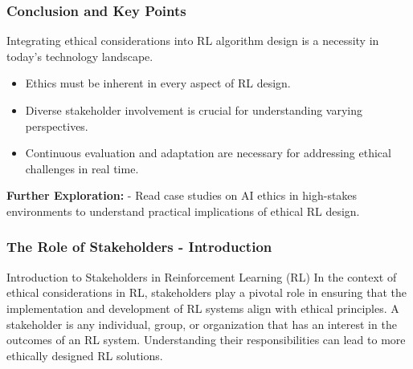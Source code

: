 \documentclass[aspectratio=169]{beamer}
\begin{document}
\begin{frame}[fragile]
    \frametitle{Conclusion and Key Points}
    
    Integrating ethical considerations into RL algorithm design is a necessity in today's technology landscape. 

    \begin{itemize}
        \item Ethics must be inherent in every aspect of RL design.
        \item Diverse stakeholder involvement is crucial for understanding varying perspectives.
        \item Continuous evaluation and adaptation are necessary for addressing ethical challenges in real time.
    \end{itemize}

    \textbf{Further Exploration:} 
    - Read case studies on AI ethics in high-stakes environments to understand practical implications of ethical RL design.
\end{frame}

\begin{frame}[fragile]
    \frametitle{The Role of Stakeholders - Introduction}
    \begin{block}{Introduction to Stakeholders in Reinforcement Learning (RL)}
        In the context of ethical considerations in RL, stakeholders play a pivotal role in ensuring that the implementation and development of RL systems align with ethical principles. 
        A stakeholder is any individual, group, or organization that has an interest in the outcomes of an RL system. Understanding their responsibilities can lead to more ethically designed RL solutions.
    \end{block}
\end{frame}
\end{document}
